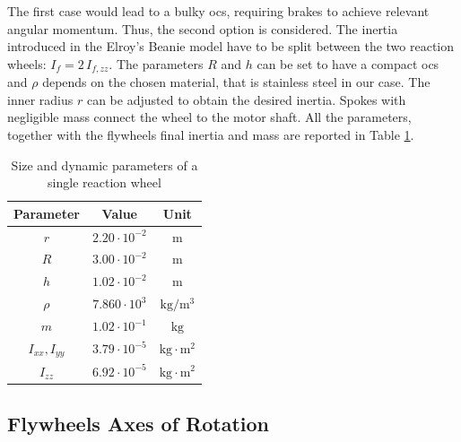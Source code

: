 \documentclass[letterpaper, 10 pt, conference]{ieeeconf}  %
\begin{document}
The first case would lead to a bulky \gls{ocs}, requiring brakes to achieve relevant angular momentum. Thus, the second option is considered. The inertia introduced in the Elroy's Beanie model have to be split between the two reaction wheels: $I_f = 2 \, I_{f, zz}$.
The parameters $R$ and $h$ can be set to have a compact \gls{ocs} and $\rho$ depends on the chosen material, that is stainless steel in our case. The inner radius $r$ can be adjusted to obtain the desired inertia. Spokes with negligible mass connect the wheel to the motor shaft. All the parameters, together with the flywheels final inertia and mass are reported in Table \ref{tab:dim_fw}.
\begin{table}
	\centering
	\caption{\small Size and dynamic parameters of a single reaction wheel}
	\begin{tabular}{ccc}
		Parameter & Value & Unit \\
		\hline
		\hline
		$r$ & $2.20\cdot 10^{-2}$ & $\mathrm{m}$ \\
		$R$ & $3.00\cdot 10^{-2}$ & $\mathrm{m}$ \\
		$h$   & $1.02\cdot 10^{-2}$ & $\mathrm{m}$ \\
		$\rho$   & $7.860 \cdot 10^{3}$ & $\mathrm{kg/m^3}$ \\
		$m$   & $1.02\cdot 10^{-1}$ & $\mathrm{kg}$ \\
		$I_{xx}, I_{yy}$   & $3.79 \cdot 10^{-5}$ & $\mathrm{kg \cdot m^2}$ \\
		$I_{zz}$   & $6.92 \cdot 10^{-5}$ & $ \mathrm{kg \cdot m^2}$ \\
	\end{tabular}
	\label{tab:dim_fw}
\end{table}

\subsection{Flywheels Axes of Rotation}
\end{document}
